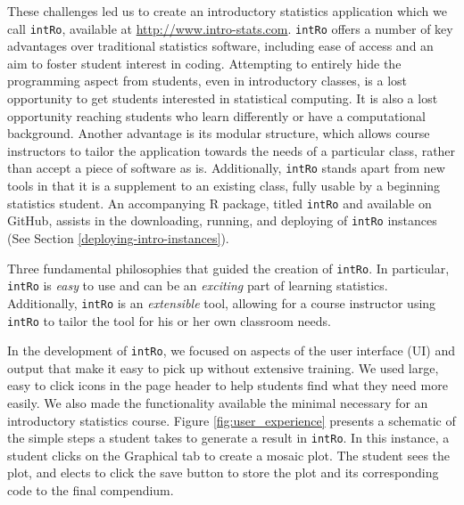 \documentclass[12pt,]{article}
\begin{document}
These challenges led us to create an introductory statistics application
which we call \texttt{intRo}, available at
\url{http://www.intro-stats.com}. \texttt{intRo} offers a number of key
advantages over traditional statistics software, including ease of
access and an aim to foster student interest in coding. Attempting to
entirely hide the programming aspect from students, even in introductory
classes, is a lost opportunity to get students interested in statistical
computing. It is also a lost opportunity reaching students who learn
differently or have a computational background. Another advantage is its
modular structure, which allows course instructors to tailor the
application towards the needs of a particular class, rather than accept
a piece of software as is. Additionally, \texttt{intRo} stands apart
from new tools in that it is a supplement to an existing class, fully
usable by a beginning statistics student. An accompanying R package,
titled \texttt{intRo} and available on GitHub, assists in the
downloading, running, and deploying of \texttt{intRo} instances (See
Section \ref{deploying-intro-instances}).

Three fundamental philosophies that guided the creation of
\texttt{intRo}. In particular, \texttt{intRo} is \emph{easy} to use and
can be an \emph{exciting} part of learning statistics. Additionally,
\texttt{intRo} is an \emph{extensible} tool, allowing for a course
instructor using \texttt{intRo} to tailor the tool for his or her own
classroom needs.

In the development of \texttt{intRo}, we focused on aspects of the user
interface (UI) and output that make it easy to pick up without extensive
training. We used large, easy to click icons in the page header to help
students find what they need more easily. We also made the functionality
available the minimal necessary for an introductory statistics course.
Figure \ref{fig:user_experience} presents a schematic of the simple
steps a student takes to generate a result in \texttt{intRo}. In this
instance, a student clicks on the Graphical tab to create a mosaic plot.
The student sees the plot, and elects to click the save button to store
the plot and its corresponding code to the final compendium.
\end{document}
